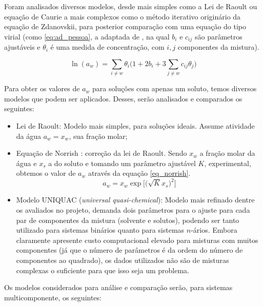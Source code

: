 \documentclass[
	12pt,				%
	openright,
	twoside,
	a4paper,			%
	english,			%
	french,				%
	brazil				%
	]{abntex2}
\begin{document}
Foram analisados diversos modelos, desde mais simples como a Lei de Raoult ou
equação de Caurie a mais complexos como o método iterativo originário da equação
de Zdanovskii, para posterior comparação com uma equação do tipo virial (como
\ref{eq:ad_pessoa}, a adaptada de \cite{pessoa2008}, na qual $b_i$ e
$c_{ij}$ são parâmetros ajustáveis e $\theta_i$ é uma medida de concentração,
com $i,j$ componentes da mistura).

\begin{equation}
	\label{eq:ad_pessoa}
	\ln(a_w) = \sum_{i \neq w}\theta_i\Bigg(1 +%
	2b_i+3\sum_{j \neq w}c_{ij}\theta_j\Bigg)
\end{equation}

Para obter os valores de $a_w$ para soluções com apenas um soluto, temos
diversos modelos que podem ser aplicados. Desses, serão analisados e comparados
os seguintes:

\begin{itemize}
	\item Lei de Raoult: Modelo mais simples, para soluções ideais. Assume
		atividade da água $a_w = x_w$, sua fração molar;
	\item Equação de Norrish \cite{norrish1966}: correção da lei de Raoult.
		Sendo $x_w$ a fração molar da água e $x_s$ a do soluto e
		tomando um parâmetro ajustável $K$, experimental, obtemos o
		valor de $a_w$ através da equação \ref{eq_norrish}.
		\begin{equation}
			\label{eq_norrish}
			a_w = x_w\exp\Big[\Big(\sqrt{K}x_s\Big)^2\Big]
		\end{equation}
	\item Modelo UNIQUAC (\textit{universal quasi-chemical}):
		\cite{abrams1975} Modelo mais refinado dentre os avaliados no
		projeto, demanda dois parâmetros para o ajuste para cada par de
		componentes da mistura (solvente e solutos), podendo ser tanto
		utilizado para sistemas binários quanto para sistemas $n$-ários.
		Embora claramente apresente custo computacional elevado para
		misturas com muitos componentes (já que o número de parâmetros
		é da ordem do número de componentes ao quadrado), os dados
		utilizados não são de misturas complexas o suficiente para que
		isso seja um problema.
\end{itemize}

Os modelos considerados para análise e comparação serão, para sistemas
multicomponente, os seguintes:
\end{document}
